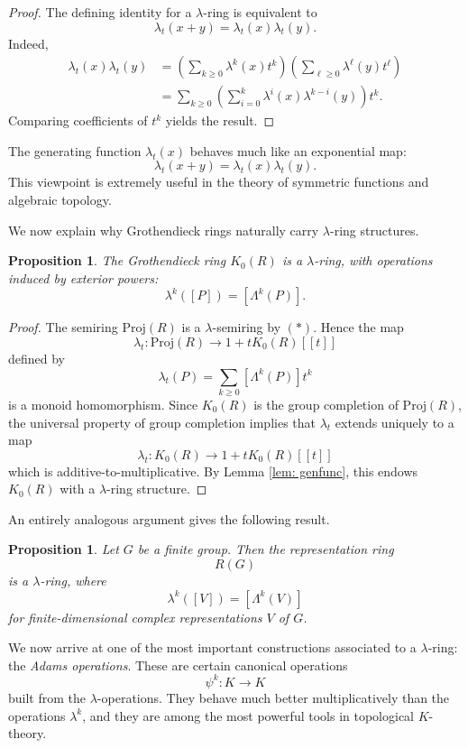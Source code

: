 \documentclass[12pt,reqno]{amsart}
\theoremstyle{plain}
\newtheorem{prop}[thm]{Proposition}
\numberwithin{equation}{section}
\begin{document}
\begin{proof}
The defining identity for a $\lambda$-ring is equivalent to
\[
\lambda_t(x+y)
=
\lambda_t(x)\lambda_t(y).
\]
Indeed,
\begin{align*}
\lambda_t(x)\lambda_t(y)
&=
\left(
\sum_{k\ge0}\lambda^k(x)t^k
\right)
\left(
\sum_{\ell\ge0}\lambda^\ell(y)t^\ell
\right)\\
&=
\sum_{k\ge0}
\left(
\sum_{i=0}^k
\lambda^i(x)\lambda^{k-i}(y)
\right)t^k.
\end{align*}
Comparing coefficients of $t^k$ yields the result.
\end{proof}

The generating function $\lambda_t(x)$ behaves much like an exponential map:
\[
\lambda_t(x+y)=\lambda_t(x)\lambda_t(y).
\]
This viewpoint is extremely useful in the theory of symmetric functions and algebraic topology.

We now explain why Grothendieck rings naturally carry $\lambda$-ring structures.

\begin{prop}
The Grothendieck ring $K_0(R)$ is a $\lambda$-ring, with operations induced by exterior powers:
\[
\lambda^k([P])=[\Lambda^k(P)].
\]
\end{prop}

\begin{proof}
The semiring $\mathrm{Proj}(R)$ is a $\lambda$-semiring by $(*)$. Hence the map
\[
\lambda_t:\mathrm{Proj}(R)\to 1+tK_0(R)[[t]]
\]
defined by
\[
\lambda_t(P)
=
\sum_{k\ge0}
[\Lambda^k(P)]t^k
\]
is a monoid homomorphism.
Since $K_0(R)$ is the group completion of $\mathrm{Proj}(R)$, the universal property of group completion implies that $\lambda_t$ extends uniquely to a map
\[
\lambda_t:K_0(R)\to 1+tK_0(R)[[t]]
\]
which is additive-to-multiplicative. By Lemma \ref{lem: genfunc}, this endows $K_0(R)$ with a $\lambda$-ring structure.
\end{proof}

An entirely analogous argument gives the following result.

\begin{prop}
Let $G$ be a finite group. Then the representation ring
\[
R(G)
\]
is a $\lambda$-ring, where
\[
\lambda^k([V])=[\Lambda^k(V)]
\]
for finite-dimensional complex representations $V$ of $G$.
\end{prop}

\medskip

We now arrive at one of the most important constructions associated to a $\lambda$-ring: the \emph{Adams operations}. These are certain canonical operations
\[
\psi^k:K\to K
\]
built from the $\lambda$-operations. They behave much better multiplicatively than the operations $\lambda^k$, and they are among the most powerful tools in topological $K$-theory.
\end{document}
